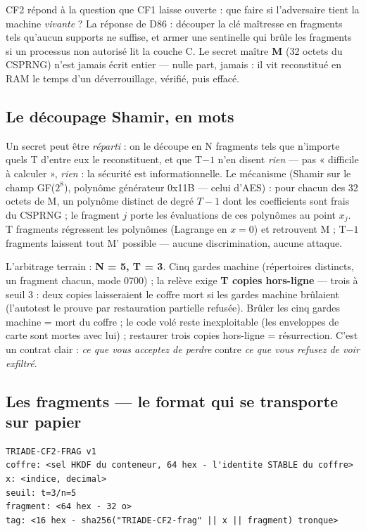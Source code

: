 CF2 répond à la question que CF1 laisse ouverte : que faire si l'adversaire tient la
machine \emph{vivante} ? La réponse de D86 : découper la clé maîtresse en fragments
tels qu'aucun supports ne suffise, et armer une sentinelle qui brûle les fragments si
un processus non autorisé lit la couche C. Le secret maître \textbf{M} (32 octets du
CSPRNG) n'est jamais écrit entier — nulle part, jamais : il vit reconstitué en RAM le
temps d'un déverrouillage, vérifié, puis effacé.

\subsection{Le découpage Shamir, en mots}

Un secret peut être \emph{réparti} : on le découpe en N fragments tels que n'importe
quels T d'entre eux le reconstituent, et que T$-1$ n'en disent \emph{rien} — pas
« difficile à calculer », \emph{rien} : la sécurité est informationnelle. Le mécanisme
(Shamir sur le champ GF($2^8$), polynôme générateur 0x11B — celui d'AES) : pour chacun
des 32 octets de M, un polynôme distinct de degré $T-1$ dont les coefficients sont
frais du CSPRNG ; le fragment $j$ porte les évaluations de ces polynômes au point
$x_j$. T fragments régressent les polynômes (Lagrange en $x=0$) et retrouvent M ;
T$-1$ fragments laissent tout M' possible — aucune discrimination, aucune attaque.

L'arbitrage terrain : \textbf{N = 5, T = 3}. Cinq gardes machine (répertoires distincts,
un fragment chacun, mode 0700) ; la relève exige \textbf{T copies hors-ligne} — trois
à seuil 3 : deux copies laisseraient le coffre mort si les gardes machine brûlaient
(l'autotest le prouve par restauration partielle refusée). Brûler les cinq gardes
machine = mort du coffre ; le code volé reste inexploitable (les enveloppes de carte
sont mortes avec lui) ; restaurer trois copies hors-ligne = résurrection. C'est un
contrat clair : \emph{ce que vous acceptez de perdre} contre \emph{ce que vous refusez
de voir exfiltré}.

\subsection{Les fragments — le format qui se transporte sur papier}

\begin{lstlisting}
TRIADE-CF2-FRAG v1
coffre: <sel HKDF du conteneur, 64 hex - l'identite STABLE du coffre>
x: <indice, decimal>
seuil: t=3/n=5
fragment: <64 hex - 32 o>
tag: <16 hex - sha256("TRIADE-CF2-frag" || x || fragment) tronque>
\end{lstlisting}

